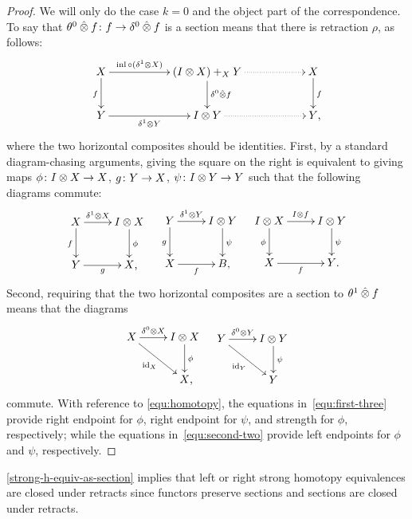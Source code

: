 \documentclass[reqno,10pt,a4paper,oneside]{amsart}
\begin{document}
\begin{proof}
We will only do the case $k = 0$ and the object part of the correspondence.
To say that $\theta^0 \mathbin{\hat{\otimes}} f \colon f \to \delta^0 \mathbin{\hat{\otimes}} f$ is a section means that there is retraction $\rho$, as follows:
\[
\xymatrix@C+3em{
  X
  \ar[r]^-{\inl \cc (\rcyl \otimes X)}
  \ar[d]_f
&
  (\interval \otimes X) +_{X} Y
  \ar[d]^{\lcyl \hatotimes f}
  \ar@{.>}[r]
&
  X
  \ar[d]^f
\\
  Y
  \ar[r]_-{\rcyl \otimes Y}
&
  \interval \otimes Y
  \ar@{.>}[r]
&
  Y
\rlap{,}}
\]
where the two horizontal composites should be identities.
First, by a standard diagram-chasing arguments, giving the square on the right is equivalent to giving maps $\phi \colon I \otimes X \to X$, $g \colon Y \to X$, $\psi \colon I \otimes Y \to Y$ such that the following diagrams commute:
\begin{align} \label{equ:first-three}
\xycenter{
  X
  \ar[r]^-{\rcyl \otimes X}
  \ar[d]_f
&
  \interval \otimes X \ar[d]^{\phi}
\\
  Y \ar[r]_{g}
&
  X
\rlap{,}}
&&
\xycenter{
  Y
  \ar[r]^-{\rcyl \otimes Y}
  \ar[d]_g
&
  \interval \otimes Y \ar[d]^{\psi}
\\
  X
  \ar[r]_f
&
  B
\rlap{,}}
&&
\xycenter{
  \interval \otimes X
  \ar[d]_\phi
  \ar[r]^{I \otimes f}
&
  \interval \otimes Y
  \ar[d]^\psi
\\
  X
  \ar[r]_{f}
&
  Y
\rlap{.}}
\end{align}
Second, requiring that the two horizontal composites are a section to $\theta^1 \mathbin{\hat{\otimes}} f$ means that the diagrams
\begin{align} \label{equ:second-two}
\xycenter{
  X
  \ar[r]^-{\lcyl \otimes X}
  \ar[dr]_{\id_X}
&
  \interval \otimes X \ar[d]^\phi
\\&
  X
\rlap{,}}
&&
\xycenter{
  Y
  \ar[r]^-{\lcyl \otimes Y}
  \ar[dr]_{\id_Y}
&
  \interval \otimes Y \ar[d]^{\psi}
\\&
  Y
}
\end{align}
commute.
With reference to \eqref{equ:homotopy}, the equations in~\eqref{equ:first-three} provide right endpoint for $\phi$, right endpoint for $\psi$, and strength for $\phi$, respectively; while the equations in~\eqref{equ:second-two} provide left endpoints for $\phi$ and $\psi$, respectively.
\end{proof}

\begin{remark}
\cref{strong-h-equiv-as-section} implies that left or right strong homotopy equivalences are closed under retracts since functors preserve sections and sections are closed under retracts.
\end{remark}
\end{document}
